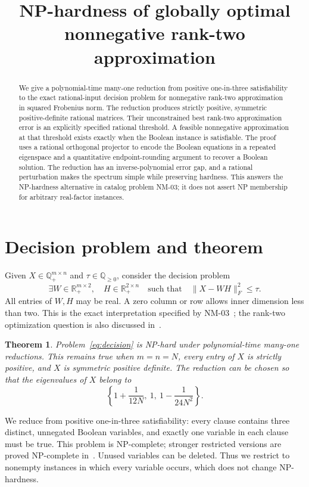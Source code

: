 \documentclass[11pt]{article}
\title{NP-hardness of globally optimal nonnegative rank-two approximation}
\author{}\date{}
\newtheorem{theorem}{Theorem}
\newcommand{\R}{\mathbb R}
\newcommand{\Q}{\mathbb Q}
\begin{document}
\maketitle
\begin{abstract}
We give a polynomial-time many-one reduction from positive one-in-three satisfiability to the exact rational-input decision problem for nonnegative rank-two approximation in squared Frobenius norm. The reduction produces strictly positive, symmetric positive-definite rational matrices. Their unconstrained best rank-two approximation error is an explicitly specified rational threshold. A feasible nonnegative approximation at that threshold exists exactly when the Boolean instance is satisfiable. The proof uses a rational orthogonal projector to encode the Boolean equations in a repeated eigenspace and a quantitative endpoint-rounding argument to recover a Boolean solution. The reduction has an inverse-polynomial error gap, and a rational perturbation makes the spectrum simple while preserving hardness. This answers the NP-hardness alternative in catalog problem NM-03; it does not assert NP membership for arbitrary real-factor instances.
\end{abstract}

\section{Decision problem and theorem}
Given $X\in\Q_+^{m\times n}$ and $\tau\in\Q_{\geq0}$, consider the decision problem
\begin{equation}\label{eq:decision}
 \exists W\in\R_+^{m\times2},\quad H\in\R_+^{2\times n}
 \quad\text{such that}\quad \|X-WH\|_F^2\leq\tau.
\end{equation}
All entries of $W,H$ may be real. A zero column or row allows inner dimension less than two. This is the exact interpretation specified by NM-03~\cite{catalog}; the rank-two optimization question is also discussed in~\cite{lnv}.

\begin{theorem}\label{thm:hard}
Problem~\eqref{eq:decision} is NP-hard under polynomial-time many-one reductions. This remains true when $m=n=N$, every entry of $X$ is strictly positive, and $X$ is symmetric positive definite. The reduction can be chosen so that the eigenvalues of $X$ belong to
\[
 \left\{1+\frac1{12N},\ 1,\ 1-\frac1{24N^2}\right\}.
\]
\end{theorem}

We reduce from positive one-in-three satisfiability: every clause contains three distinct, unnegated Boolean variables, and exactly one variable in each clause must be true. This problem is NP-complete; stronger restricted versions are proved NP-complete in~\cite{hmr}. Unused variables can be deleted. Thus we restrict to nonempty instances in which every variable occurs, which does not change NP-hardness.
\end{document}
